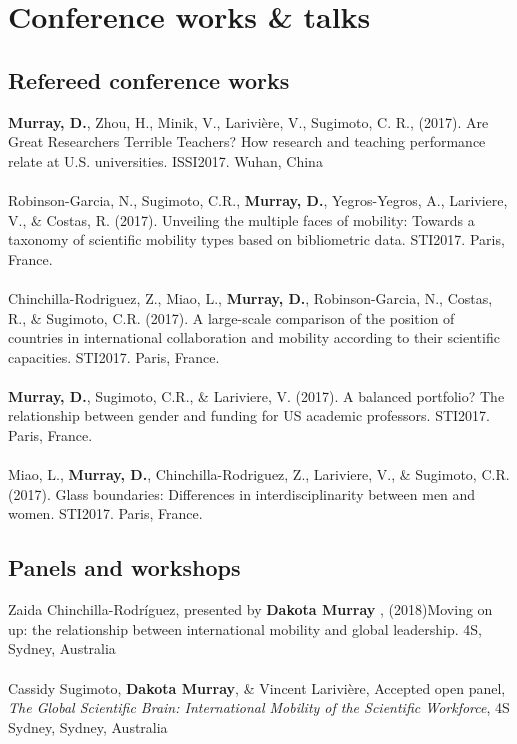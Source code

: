 \documentclass[10pt, a4paper]{article}
\newcommand{\years}[1]{\marginnote{\scriptsize #1}}
\begin{document}
\section*{Conference works \& talks}

\subsection*{Refereed conference works}
\years{2017}\textbf{Murray, D.}, Zhou, H., Minik, V., Larivière, V.,  Sugimoto, C. R., (2017). Are Great Researchers Terrible Teachers? How research and teaching performance relate at U.S. universities. ISSI2017. Wuhan, China\\
\\
\years{2017}Robinson-Garcia, N., Sugimoto, C.R., \textbf{Murray, D.}, Yegros-Yegros, A., Lariviere, V., \& Costas, R. (2017). Unveiling the multiple faces of mobility: Towards a taxonomy of scientific mobility types based on bibliometric data. STI2017. Paris, France.\\
\\
\years{2017}Chinchilla-Rodriguez, Z., Miao, L., \textbf{Murray, D.}, Robinson-Garcia, N., Costas, R., \& Sugimoto, C.R. (2017). A large-scale comparison of the position of countries in international collaboration and mobility according to their scientific capacities. STI2017. Paris, France.\\
\\
\years{2017}\textbf{Murray, D.}, Sugimoto, C.R., \& Lariviere, V. (2017). A balanced portfolio? The relationship between gender and funding for US academic professors. STI2017. Paris, France.\\
\\
\years{2017}Miao, L., \textbf{Murray, D.}, Chinchilla-Rodriguez, Z., Lariviere, V., \& Sugimoto, C.R. (2017). Glass boundaries: Differences in interdisciplinarity between men and women. STI2017. Paris, France.\\

\subsection*{Panels and workshops}
\years{2018}Zaida Chinchilla-Rodríguez, presented by \textbf{Dakota Murray }, (2018)Moving on up: the relationship between international mobility and global leadership. 4S, Sydney, Australia\\
\\
\years{2018}Cassidy Sugimoto, \textbf{Dakota Murray}, \&  Vincent Larivière, Accepted open panel, \emph{The Global Scientific Brain: International Mobility of the Scientific Workforce}, 4S Sydney, Sydney, Australia\\
\end{document}
